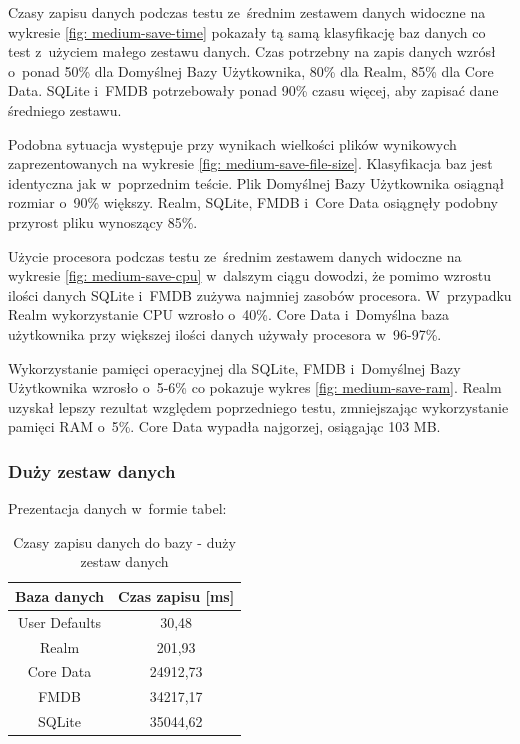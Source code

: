\newpage

Czasy zapisu danych podczas testu ze~średnim zestawem danych  widoczne na wykresie \ref{fig: medium-save-time} pokazały tą samą klasyfikację baz danych co test z~użyciem małego zestawu danych. Czas potrzebny na zapis danych wzrósł o~ponad 50\% dla Domyślnej Bazy Użytkownika, 80\% dla Realm, 85\% dla Core Data. SQLite i~FMDB potrzebowały ponad 90\% czasu więcej, aby zapisać dane średniego zestawu. \par

Podobna sytuacja występuje przy wynikach wielkości plików wynikowych zaprezentowanych na wykresie \ref{fig: medium-save-file-size}. Klasyfikacja baz jest identyczna jak w~poprzednim teście. Plik Domyślnej Bazy Użytkownika osiągnął rozmiar o~90\% większy. Realm, SQLite, FMDB i~Core Data osiągnęły podobny przyrost pliku wynoszący 85\%. \par 

Użycie procesora podczas testu ze~średnim zestawem danych widoczne na wykresie \ref{fig: medium-save-cpu} w~dalszym ciągu dowodzi, że pomimo wzrostu ilości danych SQLite i~FMDB zużywa najmniej zasobów procesora. W~przypadku Realm wykorzystanie CPU wzrosło o~40\%. Core Data i~Domyślna baza użytkownika przy większej ilości danych używały procesora w~96-97\%. \par 

Wykorzystanie pamięci operacyjnej dla SQLite, FMDB i~Domyślnej Bazy Użytkownika wzrosło o~5-6\% co pokazuje wykres \ref{fig: medium-save-ram}. Realm uzyskał lepszy rezultat względem poprzedniego testu, zmniejszając wykorzystanie pamięci RAM o~5\%. Core Data wypadła najgorzej, osiągając 103 MB. \par


\subsubsection{Duży zestaw danych}

Prezentacja danych w~formie tabel: 

\begin{table}[h]
\centering
\caption{Czasy zapisu danych do bazy - duży zestaw danych}
\label{tab: big-save-time-table}
\begin{tabular}{|c|c|}
\hline
Baza danych   & Czas zapisu [ms] \\ \hline
User Defaults & 30,48            \\ \hline
Realm         & 201,93           \\ \hline
Core Data     & 24912,73         \\ \hline
FMDB          & 34217,17         \\ \hline
SQLite        & 35044,62         \\ \hline
\end{tabular}
\end{table}

